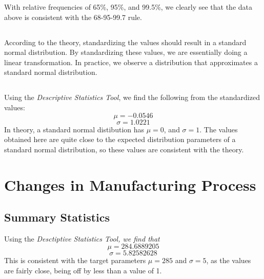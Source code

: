 \documentclass[letterpaper]{article}
\begin{document}
With relative frequencies of 65\%, 95\%, and 99.5\%, we clearly see that the
data above is consistent with the 68-95-99.7 rule.

\subsection{} %

According to the theory, standardizing the values should result in a standard normal distribution.
By standardizing these values, we are essentially doing a linear transformation.
In practice, we observe a distribution that approximates a standard normal distribution.


\subsection{} %
Using the \textit{Descriptive Statistics Tool}, we find the following from the standardized values:
$$\mu = -0.0546$$
$$\sigma = 1.0221$$
In theory, a standard normal distibution has $\mu=0$, and $\sigma=1$. The values
obtained here are quite close to the expected distribution parameters of a
standard normal distribution, so these values are consistent with the theory.

\section{Changes in Manufacturing Process}%

\subsection{Summary Statistics} %
Using the \textit{Desctiptive Statistics Tool, we find that}
$$\mu = 284.6889205$$
$$\sigma = 5.82582628$$
This is consistent with the target parameters $\mu=285$ and $\sigma=5$,
as the values are fairly close, being off by less than a value of 1.
\end{document}
